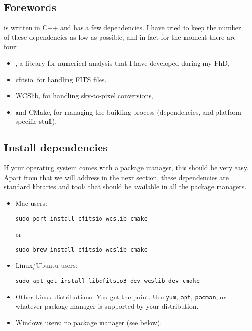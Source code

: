 \subsection{Forewords}

\egg is written in C++ and has a few dependencies. I have tried to keep the number of these dependencies as low as possible, and in fact for the moment there are four:

\begin{itemize}
\item \phypp, a library for numerical analysis that I have developed during my PhD,
\item cfitsio, for handling FITS files,
\item WCSlib, for handling sky-to-pixel conversions,
\item and CMake, for managing the building process (dependencies, and platform specific stuff).
\end{itemize}

\subsection{Install dependencies}

If your operating system comes with a package manager, this should be very easy. Apart from \phypp that we will address in the next section, these dependencies are standard libraries and tools that should be available in all the package managers.

\begin{itemize}
\item Mac users:
\begin{verbatim}
sudo port install cfitsio wcslib cmake
\end{verbatim}
or
\begin{verbatim}
sudo brew install cfitsio wcslib cmake
\end{verbatim}
\item Linux/Ubuntu users:
\begin{verbatim}
sudo apt-get install libcfitsio3-dev wcslib-dev cmake
\end{verbatim}
\item Other Linux distributions: You get the point. Use \texttt{yum}, \texttt{apt}, \texttt{pacman}, or whatever package manager is supported by your distribution.
\item Windows users: no package manager (see below).
\end{itemize}

